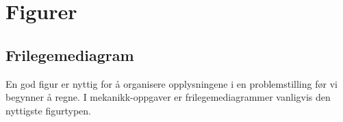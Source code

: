 \chapter{Figurer}


\section{Frilegemediagram}
En god figur er nyttig for å organisere opplysningene i en problemstilling før vi begynner å regne. I mekanikk-oppgaver er frilegemediagrammer vanligvis den nyttigste figurtypen.